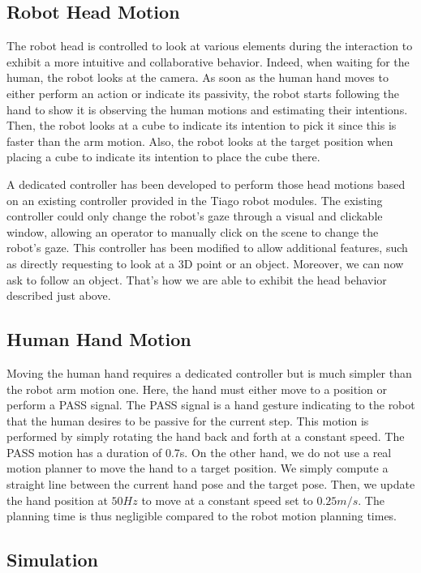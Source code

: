 \subsection{Robot Head Motion}

The robot head is controlled to look at various elements during the interaction to exhibit a more intuitive and collaborative behavior. 
Indeed, when waiting for the human, the robot looks at the camera. As soon as the human hand moves to either perform an action or indicate its passivity, the robot starts following the hand to show it is observing the human motions and estimating their intentions.
Then, the robot looks at a cube to indicate its intention to pick it since this is faster than the arm motion. 
Also, the robot looks at the target position when placing a cube to indicate its intention to place the cube there.

A dedicated controller has been developed to perform those head motions based on an existing controller provided in the Tiago robot modules. The existing controller could only change the robot's gaze through a visual and clickable window, allowing an operator to manually click on the scene to change the robot's gaze. This controller has been modified to allow additional features, such as directly requesting to look at a 3D point or an object. Moreover, we can now ask to follow an object. That's how we are able to exhibit the head behavior described just above.  

\subsection{Human Hand Motion}

Moving the human hand requires a dedicated controller but is much simpler than the robot arm motion one. Here, the hand must either move to a position or perform a PASS signal. The PASS signal is a hand gesture indicating to the robot that the human desires to be passive for the current step. This motion is performed by simply rotating the hand back and forth at a constant speed. The PASS motion has a duration of 0.7s. 
On the other hand, we do not use a real motion planner to move the hand to a target position. We simply compute a straight line between the current hand pose and the target pose. Then, we update the hand position at $50Hz$ to move at a constant speed set to $0.25 m/s$. The planning time is thus negligible compared to the robot motion planning times.

\subsection{Simulation}

